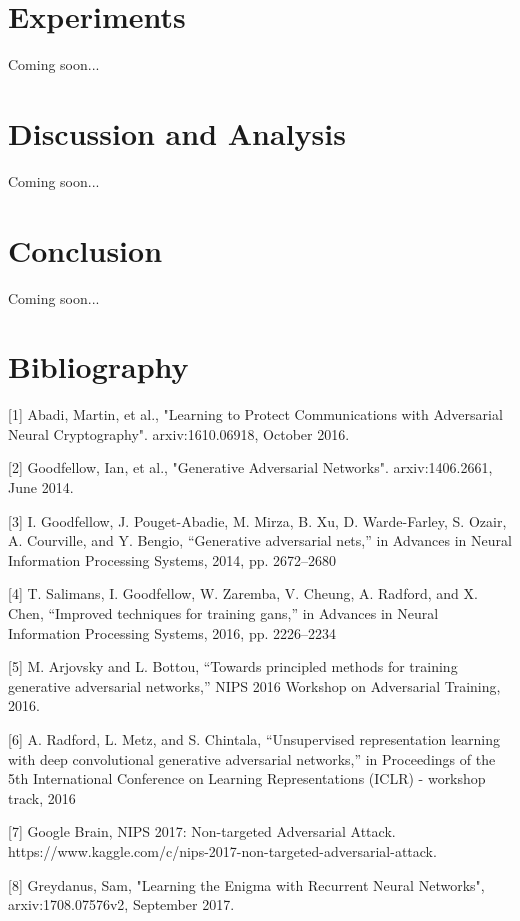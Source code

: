 \documentclass[12pt]{article}
\begin{document}
\section{Experiments}
Coming soon...

\section{Discussion and Analysis}
Coming soon...

\section{Conclusion}
Coming soon...

\section{Bibliography}

[1] Abadi, Martin, et al., "Learning to Protect Communications
with Adversarial Neural Cryptography". arxiv:1610.06918, October 2016.
\newline

[2] Goodfellow, Ian, et al., "Generative Adversarial Networks". arxiv:1406.2661, June 2014.
\newline

[3] I. Goodfellow, J. Pouget-Abadie, M. Mirza, B. Xu, D. Warde-Farley, S. Ozair, A. Courville, and Y. Bengio, “Generative adversarial nets,”
in Advances in Neural Information Processing Systems, 2014, pp. 2672–2680
\newline

[4] T. Salimans, I. Goodfellow, W. Zaremba, V. Cheung, A. Radford,
and X. Chen, “Improved techniques for training gans,” in Advances
in Neural Information Processing Systems, 2016, pp. 2226–2234
\newline

[5] M. Arjovsky and L. Bottou, “Towards principled methods for
training generative adversarial networks,” NIPS 2016 Workshop
on Adversarial Training, 2016.
\newline

[6] A. Radford, L. Metz, and S. Chintala, “Unsupervised representation
learning with deep convolutional generative adversarial
networks,” in Proceedings of the 5th International Conference on
Learning Representations (ICLR) - workshop track, 2016
\newline

[7] Google Brain, NIPS 2017: Non-targeted Adversarial Attack. https://www.kaggle.com/c/nips-2017-non-targeted-adversarial-attack.
\newline

[8] Greydanus, Sam, "Learning the Enigma with Recurrent Neural Networks", arxiv:1708.07576v2, September 2017.
\newline
\end{document}
